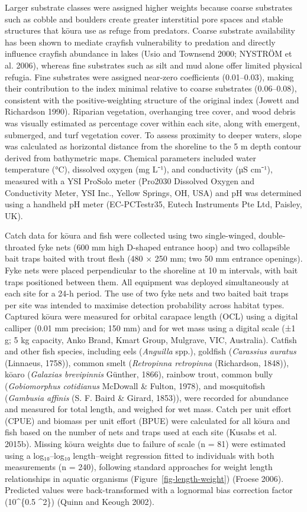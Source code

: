 \documentclass[
  12pt,
  a4paper,
]{scrbook}
\begin{document}
Larger substrate classes were assigned higher weights because coarse
substrates such as cobble and boulders create greater interstitial pore
spaces and stable structures that kōura use as refuge from predators.
Coarse substrate availability has been shown to mediate crayfish
vulnerability to predation and directly influence crayfish abundance in
lakes (Usio and Townsend 2000; NYSTRÖM et al. 2006), whereas fine
substrates such as silt and mud alone offer limited physical refugia.
Fine substrates were assigned near-zero coefficients (0.01--0.03),
making their contribution to the index minimal relative to coarse
substrates (0.06--0.08), consistent with the positive-weighting
structure of the original index (Jowett and Richardson 1990). Riparian
vegetation, overhanging tree cover, and wood debris was visually
estimated as percentage cover within each site, along with emergent,
submerged, and turf vegetation cover. To assess proximity to deeper
waters, slope was calculated as horizontal distance from the shoreline
to the 5 m depth contour derived from bathymetric maps. Chemical
parameters included water temperature (°C), dissolved oxygen (mg L⁻¹),
and conductivity (µS cm⁻¹), measured with a YSI ProSolo meter (Pro2030
Dissolved Oxygen and Conductivity Meter, YSI Inc., Yellow Springs, OH,
USA) and pH was determined using a handheld pH meter (EC-PCTestr35,
Eutech Instruments Pte Ltd, Paisley, UK).

Catch data for kōura and fish were collected using two single-winged,
double-throated fyke nets (600 mm high D-shaped entrance hoop) and two
collapsible bait traps baited with trout flesh (480 × 250 mm; two 50 mm
entrance openings). Fyke nets were placed perpendicular to the shoreline
at 10 m intervals, with bait traps positioned between them. All
equipment was deployed simultaneously at each site for a 24-h period.
The use of two fyke nets and two baited bait traps per site was intended
to maximise detection probability across habitat types. Captured kōura
were measured for orbital carapace length (OCL) using a digital calliper
(0.01 mm precision; 150 mm) and for wet mass using a digital scale (±1
g; 5 kg capacity, Anko Brand, Kmart Group, Mulgrave, VIC, Australia).
Catfish and other fish species, including eels (\emph{Anguilla} spp.),
goldfish (\emph{Carassius auratus} (Linnaeus, 1758)), common smelt
(\emph{Retropinna retropinna} (Richardson, 1848)), kōaro (\emph{Galaxias
brevipinnis} Günther, 1866), rainbow trout, common bully
(\emph{Gobiomorphus cotidianus} McDowall \& Fulton, 1978), and
mosquitofish (\emph{Gambusia affinis} (S. F. Baird \& Girard, 1853)),
were recorded for abundance and measured for total length, and weighed
for wet mass. Catch per unit effort (CPUE) and biomass per unit effort
(BPUE) were calculated for all kōura and fish based on the number of
nets and traps used at each site (Kusabs et al. 2015b). Missing kōura
weights due to failure of scale (n = 81) were estimated using a
log₁₀--log₁₀ length--weight regression fitted to individuals with both
measurements (n = 240), following standard approaches for weight length
relationships in aquatic organisms (Figure~\ref{fig-length-weight})
(Froese 2006). Predicted values were back-transformed with a lognormal
bias correction factor (10\^{}\{0.5 \cdot \sigma\^{}2\}) (Quinn and
Keough 2002).
\end{document}
